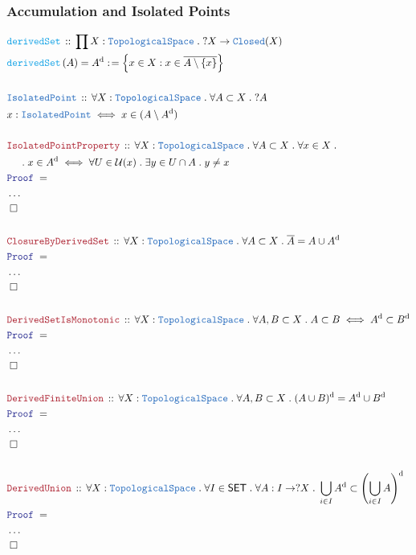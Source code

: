 \documentclass[12pt]{scrartcl}
\newcommand{\TYPE}[1]{\textcolor{NavyBlue}{\mathtt{#1}}}
\newcommand{\FUNC}[1]{\textcolor{Cerulean}{\mathtt{#1}}}
\newcommand{\LOGIC}[1]{\textcolor{Blue}{\mathtt{#1}}}
\newcommand{\THM}[1]{\textcolor{Maroon}{\mathtt{#1}}}
\renewcommand{\.}{\; . \;}
\newcommand{\de}{: \kern 0.1pc =}
\newcommand{\Act}[1]{\left( #1 \right)}
\newcommand{\Theorem}[2]{& \THM{#1} \, :: \, #2 \\ & \Proof = \\ }
\newcommand{\DeclareType}[2]{& \TYPE{#1} \, :: \, #2 \\}
\newcommand{\DefineType}[3]{& #1 : \TYPE{#2} \iff #3 \\}
\newcommand{\DeclareFunc}[2]{& \FUNC{#1} \, :: \, #2 \\}
\newcommand{\DefineNamedFunc}[4]{&  \FUNC{#1}\Act{#2} = #3 \de #4 \\}
\newcommand{\NewLine}{\\ & \kern 1pc}
\newcommand{\Page}[1]{ \begin{align*} #1 \end{align*}   }
\newcommand{\NoProof}{ & \ldots \\ \EndProof}
\newcommand{\QED}{\; \square}
\newcommand{\EndProof}{& \QED \\}
\newcommand{\Proof}{\LOGIC{Proof} \; }
\newcommand{\SET}{\mathsf{SET}}
\newcommand{\TS}{\TYPE{TopologicalSpace}}
\renewcommand{\U}{\mathcal{U}}
\renewcommand{\d}{\mathrm{d}}
\begin{document}
\subsubsection{Accumulation and Isolated Points}
\Page{
	\DeclareFunc{derivedSet}
	{
		\prod X : \TS \. 
		?X \to \TYPE{Closed}(X)
	}
	\DefineNamedFunc{derivedSet}{A}{A^\d}
	{ \Big\{ x \in X : 
		 x \in \overline{A \setminus \{x\}}   \Big\}  }
	\\
	\DeclareType{IsolatedPoint}
	{
		\forall X : \TS \.
		\forall A \subset X \.
		?A
	}
	\DefineType{x}{IsolatedPoint}
	{
		x \in (A \setminus A^\d)
	}
	\\
	\Theorem{IsolatedPointProperty}
	{
		\forall X : \TS \.
		\forall A \subset X \.
		\forall x \in X \.
		\NewLine \. 
		x  \in A^\d 
		\iff
		\forall U \in \U(x) \.
		\exists  y \in U \cap A \.
		y \neq x
	}
	\NoProof
	\\
	\Theorem{ClosureByDerivedSet}
	{
		\forall X : \TS \.
		\forall A \subset X \.
		\overline{A} = A \cup A^{\d}
	}
	\NoProof
	\\
	\Theorem{DerivedSetIsMonotonic}
	{
		\forall X  : \TS \.
		\forall A,B \subset X \. 
		A \subset B \iff A^{\d} \subset B^{\d}
	}
	\NoProof
	\\
	\Theorem{DerivedFiniteUnion}
	{
		\forall X : \TS \.
		\forall A,B \subset X \.
		(A \cup B)^\d = A^\d \cup B^\d
	}
	\NoProof
	\\
	\Theorem{DerivedUnion}
	{
		\forall X : \TS \.
		\forall I \in \SET \.
		\forall A : I \to ?X \.
		\bigcup_{i \in I} A^\d \subset 
		\left( \bigcup_{i \in I} A \right)^\d
	}
	\NoProof
}
\newpage
\end{document}

